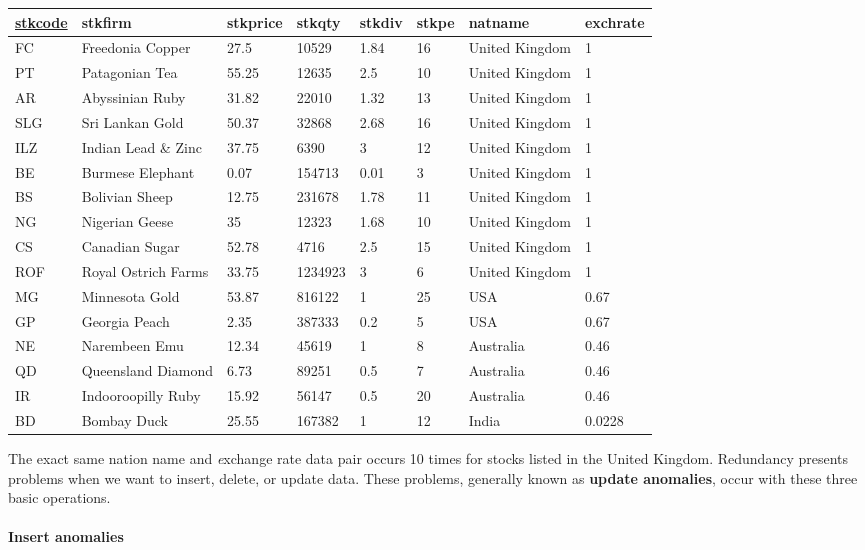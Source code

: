 \documentclass[
]{article}
\begin{document}
\begin{longtable}[]{@{}llllllll@{}}
\toprule
\underline{stkcode} & stkfirm & stkprice & stkqty & stkdiv & stkpe & natname & exchrate \\
\midrule
\endhead
FC & Freedonia Copper & 27.5 & 10529 & 1.84 & 16 & United Kingdom & 1 \\
PT & Patagonian Tea & 55.25 & 12635 & 2.5 & 10 & United Kingdom & 1 \\
AR & Abyssinian Ruby & 31.82 & 22010 & 1.32 & 13 & United Kingdom & 1 \\
SLG & Sri Lankan Gold & 50.37 & 32868 & 2.68 & 16 & United Kingdom & 1 \\
ILZ & Indian Lead \& Zinc & 37.75 & 6390 & 3 & 12 & United Kingdom & 1 \\
BE & Burmese Elephant & 0.07 & 154713 & 0.01 & 3 & United Kingdom & 1 \\
BS & Bolivian Sheep & 12.75 & 231678 & 1.78 & 11 & United Kingdom & 1 \\
NG & Nigerian Geese & 35 & 12323 & 1.68 & 10 & United Kingdom & 1 \\
CS & Canadian Sugar & 52.78 & 4716 & 2.5 & 15 & United Kingdom & 1 \\
ROF & Royal Ostrich Farms & 33.75 & 1234923 & 3 & 6 & United Kingdom & 1 \\
MG & Minnesota Gold & 53.87 & 816122 & 1 & 25 & USA & 0.67 \\
GP & Georgia Peach & 2.35 & 387333 & 0.2 & 5 & USA & 0.67 \\
NE & Narembeen Emu & 12.34 & 45619 & 1 & 8 & Australia & 0.46 \\
QD & Queensland Diamond & 6.73 & 89251 & 0.5 & 7 & Australia & 0.46 \\
IR & Indooroopilly Ruby & 15.92 & 56147 & 0.5 & 20 & Australia & 0.46 \\
BD & Bombay Duck & 25.55 & 167382 & 1 & 12 & India & 0.0228 \\
\bottomrule
\end{longtable}

The exact same nation name and \emph{e}xchange rate data pair occurs 10 times
for stocks listed in the United Kingdom. Redundancy presents problems
when we want to insert, delete, or update data. These problems,
generally known as \textbf{update anomalies}, occur with these three basic
operations.

\hypertarget{insert-anomalies}{%
\paragraph*{Insert anomalies}\label{insert-anomalies}}
\end{document}
